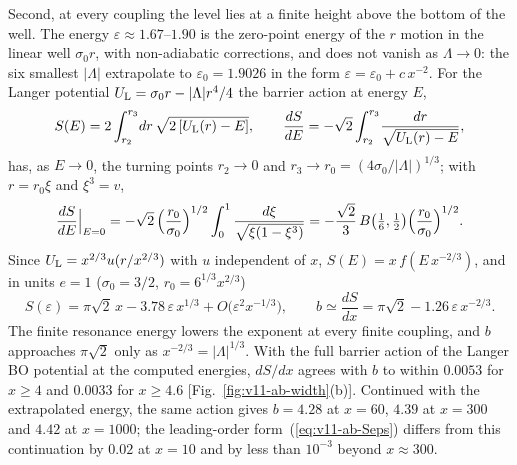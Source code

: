 Second, at every coupling the level lies at a finite height above the bottom of the well.
The energy $\varepsilon\approx1.67$--$1.90$ is the zero-point energy of the $r$ motion in the linear well $\sigma_0r$, with non-adiabatic corrections, and does not vanish as $\Lambda\to0$: the six smallest $|\Lambda|$ extrapolate to $\varepsilon_0=1.9026$ in the form $\varepsilon=\varepsilon_0+c\,x^{-2}$. %
For the Langer potential $U_{\rm L}=\sigma_0r-|\Lambda|r^4/4$ the barrier action at energy $E$,
\begin{equation}
S(E)=2\int_{r_2}^{r_3}\!dr\,\sqrt{2\,[U_{\rm L}(r)-E]},\qquad \frac{dS}{dE}=-\sqrt2\int_{r_2}^{r_3}\!\frac{dr}{\sqrt{U_{\rm L}(r)-E}},
\label{eq:v11-ab-SE}
\end{equation}
has, as $E\to0$, the turning points $r_2\to0$ and $r_3\to r_0=(4\sigma_0/|\Lambda|)^{1/3}$; with $r=r_0\xi$ and $\xi^3=v$,
\begin{equation}
\frac{dS}{dE}\Big|_{E=0}=-\sqrt2\,\Bigl(\frac{r_0}{\sigma_0}\Bigr)^{1/2}\int_0^1\frac{d\xi}{\sqrt{\xi(1-\xi^3)}}=-\frac{\sqrt2}{3}\,B\bigl(\tfrac16,\tfrac12\bigr)\Bigl(\frac{r_0}{\sigma_0}\Bigr)^{1/2} .
\label{eq:v11-ab-dSdE}
\end{equation}
Since $U_{\rm L}=x^{2/3}u(r/x^{2/3})$ with $u$ independent of $x$, $S(E)=x\,f(E\,x^{-2/3})$, and in units $e=1$ ($\sigma_0=3/2$, $r_0=6^{1/3}x^{2/3}$)
\begin{equation}
S(\varepsilon)=\pi\sqrt2\,x-3.78\,\varepsilon\,x^{1/3}+O\bigl(\varepsilon^2x^{-1/3}\bigr),\qquad b\simeq\frac{dS}{dx}=\pi\sqrt2-1.26\,\varepsilon\,x^{-2/3} . %
\label{eq:v11-ab-Seps}
\end{equation}
The finite resonance energy lowers the exponent at every finite coupling, and $b$ approaches $\pi\sqrt2$ only as $x^{-2/3}=|\Lambda|^{1/3}$.
With the full barrier action of the Langer BO potential at the computed energies, $dS/dx$ agrees with $b$ to within $0.0053$ for $x\ge4$ and $0.0033$ for $x\ge4.6$ [Fig.~\ref{fig:v11-ab-width}(b)]. %
Continued with the extrapolated energy, the same action gives $b=4.28$ at $x=60$, $4.39$ at $x=300$ and $4.42$ at $x=1000$; the leading-order form~(\ref{eq:v11-ab-Seps}) differs from this continuation by $0.02$ at $x=10$ and by less than $10^{-3}$ beyond $x\approx300$. %

